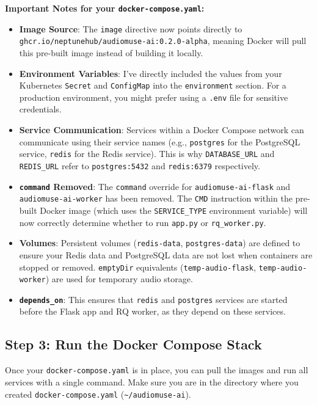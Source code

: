 \documentclass{article}
\begin{document}
\begin{enumerate}
    \textbf{Important Notes for your \texttt{docker-compose.yaml}:}
    \begin{itemize}
        \item \textbf{Image Source}: The \texttt{image} directive now points directly to \texttt{ghcr.io/neptunehub/audiomuse-ai:0.2.0-alpha}, meaning Docker will pull this pre-built image instead of building it locally.
        \item \textbf{Environment Variables}: I've directly included the values from your Kubernetes \texttt{Secret} and \texttt{ConfigMap} into the \texttt{environment} section. For a production environment, you might prefer using a \texttt{.env} file for sensitive credentials.
        \item \textbf{Service Communication}: Services within a Docker Compose network can communicate using their service names (e.g., \texttt{postgres} for the PostgreSQL service, \texttt{redis} for the Redis service). This is why \texttt{DATABASE\_URL} and \texttt{REDIS\_URL} refer to \texttt{postgres:5432} and \texttt{redis:6379} respectively.
        \item \textbf{\texttt{command} Removed}: The \texttt{command} override for \texttt{audiomuse-ai-flask} and \texttt{audiomuse-ai-worker} has been removed. The \texttt{CMD} instruction within the pre-built Docker image (which uses the \texttt{SERVICE\_TYPE} environment variable) will now correctly determine whether to run \texttt{app.py} or \texttt{rq\_worker.py}.
        \item \textbf{Volumes}: Persistent volumes (\texttt{redis-data}, \texttt{postgres-data}) are defined to ensure your Redis data and PostgreSQL data are not lost when containers are stopped or removed. \texttt{emptyDir} equivalents (\texttt{temp-audio-flask}, \texttt{temp-audio-worker}) are used for temporary audio storage.
        \item \textbf{\texttt{depends\_on}}: This ensures that \texttt{redis} and \texttt{postgres} services are started before the Flask app and RQ worker, as they depend on these services.
    \end{itemize}

\subsection*{Step 3: Run the Docker Compose Stack}

Once your \texttt{docker-compose.yaml} is in place, you can pull the images and run all services with a single command. Make sure you are in the directory where you created \texttt{docker-compose.yaml} (\texttt{\textasciitilde/audiomuse-ai}).


\end{enumerate}
\end{document}
